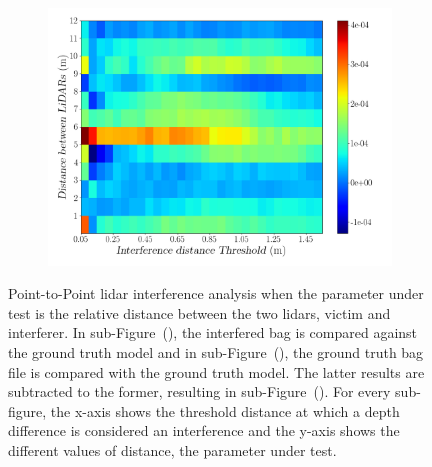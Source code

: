 \begin{figure}[!ht]
\begin{subfigure}[c]{0.45\textwidth}
	\label{fig:distance:ground-truth-color-mesh}
\end{subfigure}
\\ \vspace{4mm}
\begin{subfigure}[c]{0.6\textwidth}
	\includegraphics[width=\textwidth]{img/lidar-interference/distance/difference_ground_truth_interference_measurement.png}
\caption{}%
	\label{fig:distance:difference-color-mesh}
\end{subfigure}

\caption[Point-to-Point analysis when the distance between \acsp{lidar} is variated.]{Point-to-Point \ac{lidar} interference analysis when the parameter under test is the relative distance between the two \acp{lidar}, victim and interferer. In sub-Figure~(), the interfered bag is compared against the ground truth model and in sub-Figure~(), the ground truth bag file is compared with the ground truth model. The latter results are subtracted to the former, resulting in sub-Figure~(). For every sub-figure, the x-axis shows the threshold distance at which a depth difference is considered an interference and the y-axis shows the different values of distance, the parameter under test.}
\label{fig:distance:color-mesh}
\end{figure}

